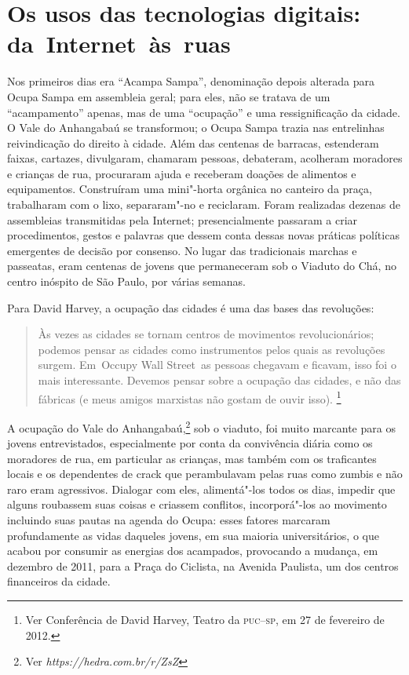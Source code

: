 \section{Os usos das tecnologias digitais: da~Internet~às~ruas}

Nos primeiros dias era ``Acampa Sampa'', denominação depois alterada
para Ocupa Sampa em assembleia geral; para eles, não se tratava de um
``acampamento'' apenas, mas de uma ``ocupação'' e uma ressignificação da
cidade. O Vale do Anhangabaú se transformou; o Ocupa Sampa trazia nas
entrelinhas reivindicação do direito à cidade. Além das centenas de
barracas, estenderam faixas, cartazes, divulgaram, chamaram pessoas,
debateram, acolheram moradores e crianças de rua, procuraram ajuda e
receberam doações de alimentos e equipamentos. Construíram uma
mini"-horta orgânica no canteiro da praça, trabalharam com o lixo,
separaram"-no e reciclaram. Foram realizadas dezenas de assembleias
transmitidas pela Internet; presencialmente passaram a criar
procedimentos, gestos e palavras que dessem conta dessas novas práticas
políticas emergentes de decisão por consenso. No lugar das tradicionais
marchas e passeatas, eram centenas de jovens que permaneceram sob o
Viaduto do Chá, no centro inóspito de São Paulo, por várias semanas.

Para David Harvey, a ocupação das cidades é uma das bases das
revoluções:

\begin{quote}
Às vezes as cidades se tornam centros de movimentos revolucionários;
podemos pensar as cidades como instrumentos pelos quais as revoluções
surgem. Em~Occupy Wall Street~as pessoas chegavam e ficavam, isso foi o
mais interessante. Devemos pensar sobre a ocupação das cidades, e não
das fábricas (e meus amigos marxistas não gostam de ouvir isso).
\footnote{Ver Conferência de David Harvey, Teatro da \textsc{puc--sp}, em 27 de
  fevereiro de 2012.} %
\end{quote}

A ocupação do Vale do Anhangabaú,\footnote{Ver
  \emph{https://hedra.com.br/r/ZsZ}} sob o
viaduto, foi muito marcante para os jovens entrevistados,
especialmente por conta da convivência diária como os moradores de rua,
em particular as crianças, mas também com os traficantes locais e os
dependentes de crack que perambulavam pelas ruas como zumbis e não raro
eram agressivos. Dialogar com eles, alimentá"-los todos os dias, impedir
que alguns roubassem suas coisas e criassem conflitos, incorporá"-los ao
movimento incluindo suas pautas na agenda do Ocupa: esses fatores
marcaram profundamente as vidas daqueles jovens, em sua maioria
universitários, o que acabou por consumir as energias dos
acampados, provocando a mudança, em dezembro de 2011, para a Praça do
Ciclista, na Avenida Paulista, um dos centros financeiros da cidade.

